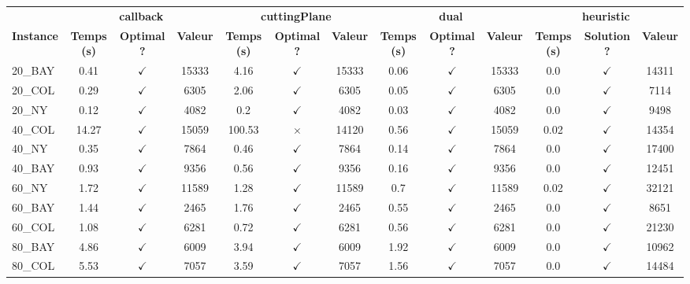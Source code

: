 \documentclass[main.tex]{subfiles}
\begin{document}
\begin{landscape}
\begin{center}
\renewcommand{\arraystretch}{1.4} 
 \begin{tabular}{lcccccccccccc}
	\hline
 & \multicolumn{3}{c}{\textbf{callback}} & \multicolumn{3}{c}{\textbf{cuttingPlane}} & \multicolumn{3}{c}{\textbf{dual}} & \multicolumn{3}{c}{\textbf{heuristic}}\\
\textbf{Instance}  & \textbf{Temps (s)} & \textbf{Optimal ?} & \textbf{Valeur} & \textbf{Temps (s)} & \textbf{Optimal ?} & \textbf{Valeur} & \textbf{Temps (s)} & \textbf{Optimal ?} & \textbf{Valeur} & \textbf{Temps (s)} & \textbf{Solution ?} & \textbf{Valeur}\\\hline

20\_BAY & 0.41 & $\checkmark$ & 15333 & 4.16 & $\checkmark$ & 15333 & 0.06 & $\checkmark$ & 15333 & 0.0 & $\checkmark$ & 14311\\
20\_COL & 0.29 & $\checkmark$ & 6305 & 2.06 & $\checkmark$ & 6305 & 0.05 & $\checkmark$ & 6305 & 0.0 & $\checkmark$ & 7114\\
20\_NY & 0.12 & $\checkmark$ & 4082 & 0.2 & $\checkmark$ & 4082 & 0.03 & $\checkmark$ & 4082 & 0.0 & $\checkmark$ & 9498\\
40\_COL & 14.27 & $\checkmark$ & 15059 & 100.53 & $\times$ & 14120 & 0.56 & $\checkmark$ & 15059 & 0.02 & $\checkmark$ & 14354\\
40\_NY & 0.35 & $\checkmark$ & 7864 & 0.46 & $\checkmark$ & 7864 & 0.14 & $\checkmark$ & 7864 & 0.0 & $\checkmark$ & 17400\\
40\_BAY & 0.93 & $\checkmark$ & 9356 & 0.56 & $\checkmark$ & 9356 & 0.16 & $\checkmark$ & 9356 & 0.0 & $\checkmark$ & 12451\\
60\_NY & 1.72 & $\checkmark$ & 11589 & 1.28 & $\checkmark$ & 11589 & 0.7 & $\checkmark$ & 11589 & 0.02 & $\checkmark$ & 32121\\
60\_BAY & 1.44 & $\checkmark$ & 2465 & 1.76 & $\checkmark$ & 2465 & 0.55 & $\checkmark$ & 2465 & 0.0 & $\checkmark$ & 8651\\
60\_COL & 1.08 & $\checkmark$ & 6281 & 0.72 & $\checkmark$ & 6281 & 0.56 & $\checkmark$ & 6281 & 0.0 & $\checkmark$ & 21230\\
80\_BAY & 4.86 & $\checkmark$ & 6009 & 3.94 & $\checkmark$ & 6009 & 1.92 & $\checkmark$ & 6009 & 0.0 & $\checkmark$ & 10962\\
80\_COL & 5.53 & $\checkmark$ & 7057 & 3.59 & $\checkmark$ & 7057 & 1.56 & $\checkmark$ & 7057 & 0.0 & $\checkmark$ & 14484\\

\end{tabular}
\end{center}
\end{landscape}
\end{document}
